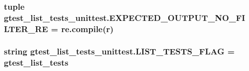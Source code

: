 \subsubsection[{E\+X\+P\+E\+C\+T\+E\+D\+\_\+\+O\+U\+T\+P\+U\+T\+\_\+\+N\+O\+\_\+\+F\+I\+L\+T\+E\+R\+\_\+\+R\+E}]{\setlength{\rightskip}{0pt plus 5cm}tuple gtest\+\_\+list\+\_\+tests\+\_\+unittest.\+E\+X\+P\+E\+C\+T\+E\+D\+\_\+\+O\+U\+T\+P\+U\+T\+\_\+\+N\+O\+\_\+\+F\+I\+L\+T\+E\+R\+\_\+\+R\+E = re.\+compile(r)}\label{namespacegtest__list__tests__unittest_a57e38bc2bb7e78ba6b2ae48a1569d1f3}
\hypertarget{namespacegtest__list__tests__unittest_a658d9ea18c57a13a25d0cce73d314e7a}{}
\subsubsection[{L\+I\+S\+T\+\_\+\+T\+E\+S\+T\+S\+\_\+\+F\+L\+A\+G}]{\setlength{\rightskip}{0pt plus 5cm}string gtest\+\_\+list\+\_\+tests\+\_\+unittest.\+L\+I\+S\+T\+\_\+\+T\+E\+S\+T\+S\+\_\+\+F\+L\+A\+G = \textquotesingle{}gtest\+\_\+list\+\_\+tests\textquotesingle{}}\label{namespacegtest__list__tests__unittest_a658d9ea18c57a13a25d0cce73d314e7a}
